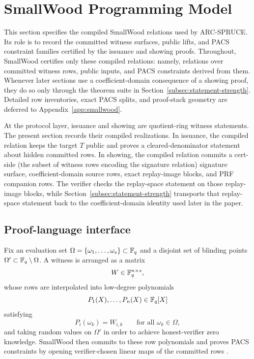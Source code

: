 \section{SmallWood Programming Model}
\label{sec:smallwood-model}
\label{sec:smallwood}

This section specifies the compiled SmallWood relations used by ARC-SPRUCE. Its role is to record the committed witness
surfaces, public lifts, and PACS constraint families certified by the issuance and showing proofs. Throughout, SmallWood
certifies only these compiled relations: namely, relations over committed witness rows, public inputs, and PACS
constraints derived from them. Whenever later sections use a coefficient-domain consequence of a showing proof, they do so
only through the theorem suite in Section~\ref{subsec:statement-strength}. Detailed row inventories, exact PACS splits,
and proof-stack geometry are deferred to Appendix~\ref{app:smallwood}.

At the protocol layer, issuance and showing are quotient-ring witness statements. The present section records their
compiled realizations. In issuance, the compiled relation keeps the target \(T\) public and proves a cleared-denominator
statement about hidden committed rows. In showing, the compiled relation commits a cert-side (the subset of witness rows 
encoding the signature relation) signature surface, coefficient-domain source rows, exact replay-image blocks, and PRF 
companion rows. The verifier checks the replay-space statement on those replay-image blocks, while
Section~\ref{subsec:statement-strength} transports that replay-space statement back to the coefficient-domain identity 
used later in the paper.

\subsection{Proof-language interface}
\label{subsec:smallwood-interface}
Fix an evaluation set \(\Omega=\{\omega_1,\ldots,\omega_s\}\subset \mathbb{F}_q\) and a disjoint set of blinding points
\(\Omega'\subset \mathbb{F}_q\setminus \Omega\). A witness is arranged as a matrix
\[
W\in \mathbb{F}_q^{n\times s},
\]
whose rows are interpolated into low-degree polynomials
\[
P_1(X),\ldots,P_n(X)\in \mathbb{F}_q[X]
\]
satisfying
\[
P_i(\omega_k)=W_{i,k}\qquad\text{for all }\omega_k\in\Omega,
\]
and taking random values on \(\Omega'\) in order to achieve honest-verifier zero knowledge. SmallWood then commits to
these row polynomials and proves PACS constraints by opening verifier-chosen linear maps of the committed rows
\cite{EPRINT:FenRiv25b}.

